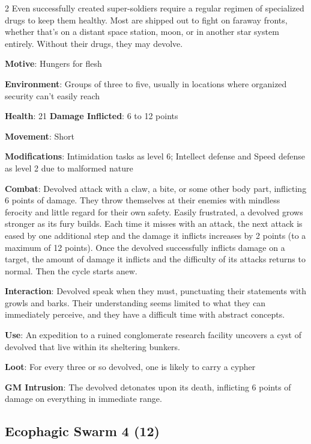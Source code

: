 \begin{multicols}{2}
Even successfully created super-soldiers require a regular regimen of specialized drugs to keep them healthy. Most are shipped out to fight on faraway fronts, whether that’s on a distant space station, moon, or in another star system entirely. Without their drugs, they may devolve.

\textbf{Motive}: Hungers for flesh 

\textbf{Environment}: Groups of three to five, usually in locations where organized security can’t easily reach 

\textbf{Health}: 21 \textbf{Damage Inflicted}: 6 to 12 points 

\textbf{Movement}: Short 

\textbf{Modifications}: Intimidation tasks as level 6; Intellect defense and Speed defense as level 2 due to malformed nature 

\textbf{Combat}: Devolved attack with a claw, a bite, or some other body part, inflicting 6 points of damage. They throw themselves at their enemies with mindless ferocity and little regard for their own safety. Easily frustrated, a devolved grows stronger as its fury builds. Each time it misses with an attack, the next attack is eased by one additional step and the damage it inflicts increases by 2 points (to a maximum of 12 points). Once the devolved successfully inflicts damage on a target, the amount of damage it inflicts and the difficulty of its attacks returns to normal. Then the cycle starts anew. 

\textbf{Interaction}: Devolved speak when they must, punctuating their statements with growls and barks. Their understanding seems limited to what they can immediately perceive, and they have a difficult time with abstract concepts. 

\textbf{Use}: An expedition to a ruined conglomerate research facility uncovers a cyst of devolved that live within its sheltering bunkers. 

\textbf{Loot}: For every three or so devolved, one is likely to carry a cypher

\textbf{GM Intrusion}: The devolved detonates upon its death, inflicting 6 points of damage on everything in immediate range.

\subsection{Ecophagic Swarm 4 (12)}


\end{multicols}
